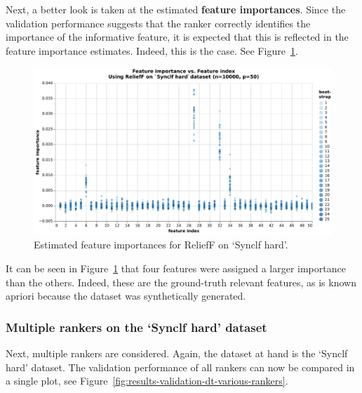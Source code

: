 \documentclass[../main.tex]{subfiles}
\begin{document}
Next, a better look is taken at the estimated \textbf{feature importances}. Since the validation performance suggests that the ranker correctly identifies the importance of the informative feature, it is expected that this is reflected in the feature importance estimates. Indeed, this is the case. See Figure~\ref{fig:results-importances-relieff}.
\begin{figure}[ht]
    \centering
    \includegraphics[width=\linewidth]{report/images/results-importances-relieff.pdf}
    \caption{Estimated feature importances for ReliefF on `Synclf hard'.}
    \label{fig:results-importances-relieff}
\end{figure}

It can be seen in Figure~\ref{fig:results-importances-relieff} that four features were assigned a larger importance than the others.  Indeed, these are the ground-truth relevant features, as is known \gls{apriori} because the dataset was synthetically generated. 




\subsubsection{Multiple rankers on the `Synclf hard' dataset}
Next, multiple rankers are considered. Again, the dataset at hand is the `Synclf hard' dataset. The validation performance of all rankers can now be compared in a single plot, see Figure~\ref{fig:results-validation-dt-various-rankers}.
\end{document}
